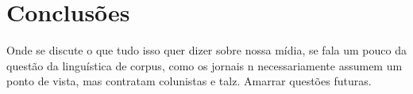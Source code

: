 






\section{Conclusões}
\label{estudo:sec4}
Onde se discute o que tudo isso quer dizer sobre nossa mídia, se fala um pouco da questão da linguística de corpus, como os jornais n necessariamente assumem um ponto de vista, mas contratam colunistas e talz. Amarrar questões futuras.

